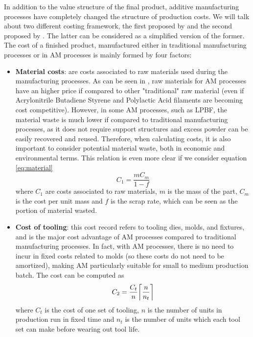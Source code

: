 In addition to the value structure of the final product, additive manufacturing processes have completely changed the structure of production costs. We will talk about two different costing framework, the first proposed by \cite{ruffo_cost_2006} and the second proposed by \cite{hopkinson_analysis_2003}. The latter can be considered as a simplified version of the former. The cost of a finished product, manufactured either in traditional manufacturing processes or in AM processes is mainly formed by four factors:
\begin{itemize}
    \item \textbf{Material costs}: are costs associated to raw materials used during the manufacturing processes. As can be seen in \cite{thomas_costs_2014}, raw materials for AM processes have an higher price if compared to other "traditional" raw material (even if Acrylonitrile Butadiene Styrene and Polylactic Acid filaments are becoming cost competitive). However, in some AM processes, such as LPBF, the material waste is much lower if compared to traditional manufacturing processes, as it does not require support structures and excess powder can be easily recovered and reused. Therefore, when calculating costs, it is also important to consider potential material waste, both in economic and environmental terms. This relation is even more clear if we consider equation \ref{eq:material} 
    \begin{equation}\label{eq:material}
        C_1 = \frac{mC_m}{1-f}
    \end{equation}
    where $C_1$ are costs associated to raw materials, $m$ is the mass of the part, $C_m$ is the cost per unit mass and $f$ is the scrap rate, which can be seen as the portion of material wasted.
    \item \textbf{Cost of tooling}: this cost record refers to tooling dies, molds, and fixtures, and is the major cost advantage of AM processes compared to traditional manufacturing processes. In fact, with AM processes, there is no need to incur in fixed costs related to molds (so these costs do not need to be amortized), making AM particularly suitable for small to medium production batch. The cost can be computed as
    \begin{equation}
        C_2=\frac{C_t}{n}\ceil*{\frac{n}{n_t}}
    \end{equation}
    where $C_t$ is the cost of one set of tooling, $n$ is the number of units in production run in fixed time and $n_t$ is the number of units which each tool set can make before wearing out tool life.

\end{itemize}
